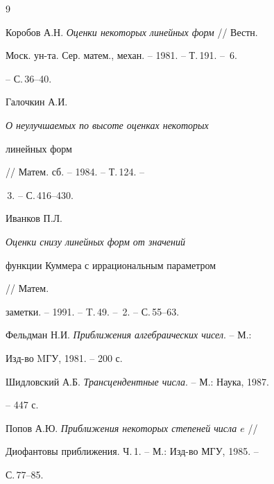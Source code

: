 \begin{thebibliography}{9} 


 




Коробов А.Н. {\em Оценки некоторых линейных форм} // Вестн. 


Моск. ун-та. Сер. матем., механ. -- 1981. -- Т.\,191. -- \No\,6. 


-- С.\,36--40. 




Галочкин А.И. {\em О неулучшаемых по высоте оценках некоторых 


линейных форм} // Матем. сб. -- 1984. -- Т.\,124. -- 


\No\,3. -- С.\,416--430. 




Иванков П.Л. {\em Оценки снизу линейных форм от значений 


функции Куммера с иррациональным параметром} // Матем. 


заметки. -- 1991. -- T.\,49. -- \No\,2. -- С.\,55--63. 




Фельдман Н.И. {\em Приближения алгебраических чисел}. -- М.: 


Изд-во MГУ, 1981. -- 200 с. 




Шидловский А.Б. {\em Трансцендентные числа}. -- М.: Наука, 1987. 


-- 447 с. 




Попов А.Ю. {\em Приближения некоторых степеней числа $e$} // 


Диофантовы приближения. Ч.\,1. -- М.: Изд-во МГУ, 1985. -- 


С.\,77--85. 


 


\end{thebibliography} 


 


\vskip 1cm 


 






 


\label{end} 


 


